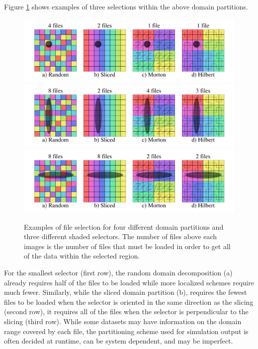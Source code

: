 \documentclass[apjl]{emulateapj}
\begin{document}
Figure \ref{fig:selectors} shows examples of three selections within the above domain partitions. 
%
\begin{figure}[htbp]
\begin{center}
\includegraphics[width=\columnwidth,keepaspectratio]{../images/selector1.png}
\includegraphics[width=\columnwidth,keepaspectratio]{../images/selector5.png}
\includegraphics[width=\columnwidth,keepaspectratio]{../images/selector4.png}
\caption{Examples of file selection for four different domain partitions and three different shaded selectors. The number of files above each images is the number of files that must be loaded in order to get all of the data within the selected region.}
\label{fig:selectors}
\end{center}
\end{figure}
%
For the smallest selector (first row), the random domain decomposition (a) already requires half of the files to be loaded while more localized schemes require much fewer. Similarly, while the sliced domain partition (b), requires the fewest files to be loaded when the selector is oriented in the same direction as the slicing (second row), it requires all of the files when the selector is perpendicular to the slicing (third row). While some datasets may have information on the domain range covered by each file, the partitioning scheme used for simulation output is often decided at runtime, can be system dependent, and may be imperfect. 
\end{document}
